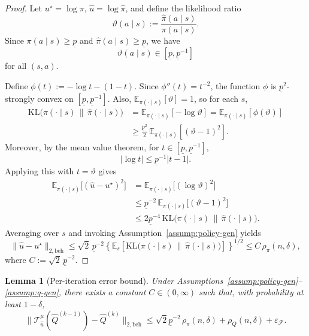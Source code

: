 \documentclass{article}
\newtheorem{lemma}{Lemma}
\newcommand{\E}{\mathbb{E}}
\newcommand{\1}{\mathbbm{1}}
\begin{document}
\begin{proof}
Let \(u^\star=\log \pi\), \(\hat u=\log \hat\pi\), and define the likelihood
ratio
\[
\vartheta(a\mid s):=\frac{\hat\pi(a\mid s)}{\pi(a\mid s)}.
\]
Since \(\pi(a\mid s)\ge \underline p\) and \(\hat\pi(a\mid s)\ge \underline p\),
we have
\[
\vartheta(a\mid s)\in [\underline p, \underline p^{-1}]
\]
for all \((s,a)\).

Define \(\phi(t):=-\log t-(1-t)\). Since \(\phi''(t)=t^{-2}\), the function
\(\phi\) is \(\underline p^2\)-strongly convex on
\([\underline p,\underline p^{-1}]\). Also,
\(\E_{\pi(\cdot\mid s)}[\vartheta]=1\), so for each \(s\),
\begin{align*}
\mathrm{KL}\!\big(\pi(\cdot\mid s)\,\|\,\hat\pi(\cdot\mid s)\big)
&=
\E_{\pi(\cdot\mid s)}[-\log \vartheta]
=
\E_{\pi(\cdot\mid s)}[\phi(\vartheta)] \\
&\ge
\frac{\underline p^2}{2}\,
\E_{\pi(\cdot\mid s)}[(\vartheta-1)^2].
\end{align*}
Moreover, by the mean value theorem, for \(t\in[\underline p,\underline p^{-1}]\),
\[
|\log t|
\le
\underline p^{-1} |t-1|.
\]
Applying this with \(t=\vartheta\) gives
\begin{align*}
\E_{\pi(\cdot\mid s)}\big[(\hat u-u^\star)^2\big]
&=
\E_{\pi(\cdot\mid s)}\big[(\log \vartheta)^2\big] \\
&\le
\underline p^{-2}\,\E_{\pi(\cdot\mid s)}\big[(\vartheta-1)^2\big] \\
&\le
2\underline p^{-4}\,
\mathrm{KL}\!\big(\pi(\cdot\mid s)\,\|\,\hat\pi(\cdot\mid s)\big).
\end{align*}
Averaging over \(s\) and invoking Assumption~\ref{assump:policy-gen} yields
\[
\|\hat u-u^\star\|_{2,\mathrm{beh}}
\le
\sqrt{2}\,\underline p^{-2}
\left\{
\E_s\!\left[
\mathrm{KL}\!\big(\pi(\cdot\mid s)\,\|\,\hat\pi(\cdot\mid s)\big)
\right]
\right\}^{1/2}
\le
C\,\rho_{\pi}(n,\delta),
\]
where \(C:=\sqrt{2}\,\underline p^{-2}\).
\end{proof}

\begin{lemma}[Per-iteration error bound]
\label{lemma::periter}
Under Assumptions~\ref{assump:policy-gen}--\ref{assump:q-gen}, there exists a
constant \(C \in (0,\infty)\) such that, with probability at least \(1-\delta\),
\[
\|\mathcal T_{\hat u}^\mu(\hat Q^{(k-1)})-\hat Q^{(k)}\|_{2,\mathrm{beh}}
\le
\sqrt{2}\underline p^{-2}\,\rho_\pi(n,\delta)+\rho_{Q}(n,\delta)+\varepsilon_{\mathcal F}.
\]
\end{lemma}
\end{document}
